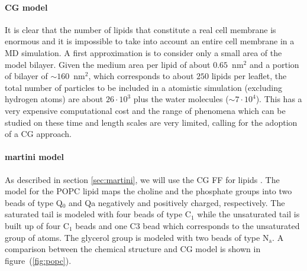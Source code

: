 \paragraph{\textbf{CG model}} It is clear that the number of lipids that constitute a real cell membrane is 
enormous and it is impossible to take into account an entire cell membrane in a \ac{MD} simulation. A first 
approximation is to consider only a small area of the model bilayer. Given the medium area per lipid of about 
$0.65$~nm$^2$ and a portion of bilayer of $\sim 160$~nm$^2$, which corresponds to about $250$ lipids per leaflet, 
the total number of particles to be included in a atomistic simulation (excluding hydrogen atoms) are about 
$26\cdot 10^3$ plus the water molecules ($\sim 7\cdot 10^4$). This has a very expensive computational cost and 
the range of phenomena which can be studied on these time and length scales are very limited, calling for the 
adoption of a \ac{CG} approach.

\paragraph{\textbf{martini model}} As described in section \ref{sec:martini}, we will use the 
\ac{CG} \martini \ac{FF} for lipids \cite{Martini}.
The \martini model for the \ac{POPC} lipid maps the choline and the phosphate groups into two beads of type Q$_0$ 
and Qa negatively and positively charged, respectively. The saturated tail is modeled with four beads of type 
C$_1$ while the unsaturated tail is built up of four C$_1$ beads and one C$3$ bead which corresponds to the 
unsaturated group of atoms. The glycerol group is modeled with two beads of type N$_\text{a}$. A comparison 
between the chemical structure and \ac{CG} model is shown in figure~(\ref{fig:popc}).

